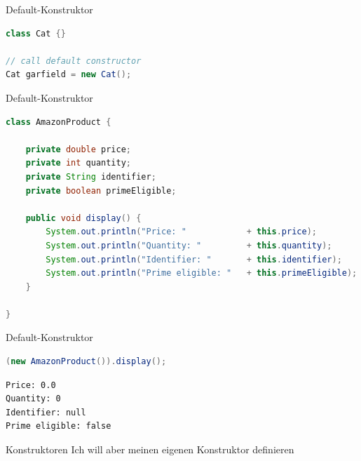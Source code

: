 \documentclass[18pt]{beamer}
\begin{document}
\begin{frame}[fragile]{Default-Konstruktor}
    \begin{exampleblock}{}
        \begin{lstlisting}[language=Java]
class Cat {}

// call default constructor
Cat garfield = new Cat();
        \end{lstlisting}
    \end{exampleblock}
\end{frame}


\begin{frame}[fragile]{Default-Konstruktor}
    \begin{exampleblock}{}
        \begin{lstlisting}[language=Java,basicstyle=\scriptsize]
class AmazonProduct {

    private double price;
    private int quantity;
    private String identifier;
    private boolean primeEligible;

    public void display() {
        System.out.println("Price: "            + this.price);
        System.out.println("Quantity: "         + this.quantity);
        System.out.println("Identifier: "       + this.identifier);
        System.out.println("Prime eligible: "   + this.primeEligible);
    }

}
        \end{lstlisting}

    \end{exampleblock}

\end{frame}

\begin{frame}[fragile]{Default-Konstruktor}
\begin{exampleblock}{}
    \begin{lstlisting}[language=Java]
(new AmazonProduct()).display();
    \end{lstlisting}
\end{exampleblock}

    \begin{exampleblock}{}
        \begin{lstlisting}
Price: 0.0
Quantity: 0
Identifier: null
Prime eligible: false
        \end{lstlisting}
    \end{exampleblock}
\end{frame}

\begin{frame}{Konstruktoren}
    \center
    \Huge{Ich will aber meinen eigenen Konstruktor definieren}
\end{frame}
\end{document}
